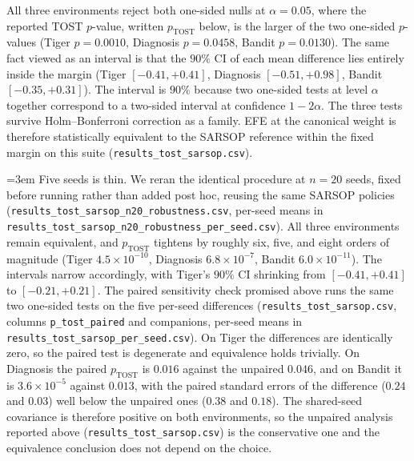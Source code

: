 All three environments reject both one-sided nulls at $\alpha{=}0.05$, where the reported TOST $p$-value, written $p_{\mathrm{TOST}}$ below, is the larger of the two one-sided $p$-values (Tiger $p{=}0.0010$, Diagnosis $p{=}0.0458$, Bandit $p{=}0.0130$). The same fact viewed as an interval is that the $90\%$ CI of each mean difference lies entirely inside the margin (Tiger $[-0.41,+0.41]$, Diagnosis $[-0.51,+0.98]$, Bandit $[-0.35,+0.31]$). The interval is $90\%$ because two one-sided tests at level $\alpha$ together correspond to a two-sided interval at confidence $1 - 2\alpha$. The three tests survive Holm--Bonferroni correction as a family. EFE at the canonical weight is therefore statistically equivalent to the SARSOP reference within the fixed margin on this suite (\texttt{results\_\allowbreak tost\_\allowbreak sarsop.csv}).

{\emergencystretch=3em Five seeds is thin. We reran the identical procedure at $n{=}20$ seeds, fixed before running rather than added post hoc, reusing the same SARSOP policies (\texttt{results\_\allowbreak tost\_\allowbreak sarsop\_\allowbreak n20\_\allowbreak robustness.csv}, per-seed means in \texttt{results\_\allowbreak tost\_\allowbreak sarsop\_\allowbreak n20\_\allowbreak robustness\_\allowbreak per\_\allowbreak seed.csv}). All three environments remain equivalent, and $p_{\mathrm{TOST}}$ tightens by roughly six, five, and eight orders of magnitude (Tiger $4.5{\times}10^{-10}$, Diagnosis $6.8{\times}10^{-7}$, Bandit $6.0{\times}10^{-11}$). The intervals narrow accordingly, with Tiger's $90\%$ CI shrinking from $[-0.41,+0.41]$ to $[-0.21,+0.21]$. The paired sensitivity check promised above runs the same two one-sided tests on the five per-seed differences (\texttt{results\_\allowbreak tost\_\allowbreak sarsop.csv}, columns \texttt{p\_\allowbreak tost\_\allowbreak paired} and companions, per-seed means in \texttt{results\_\allowbreak tost\_\allowbreak sarsop\_\allowbreak per\_\allowbreak seed.csv}). On Tiger the differences are identically zero, so the paired test is degenerate and equivalence holds trivially. On Diagnosis the paired $p_{\mathrm{TOST}}$ is $0.016$ against the unpaired $0.046$, and on Bandit it is $3.6{\times}10^{-5}$ against $0.013$, with the paired standard errors of the difference ($0.24$ and $0.03$) well below the unpaired ones ($0.38$ and $0.18$). The shared-seed covariance is therefore positive on both environments, so the unpaired analysis reported above (\texttt{results\_\allowbreak tost\_\allowbreak sarsop.csv}) is the conservative one and the equivalence conclusion does not depend on the choice.\par}

